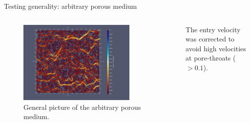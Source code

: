 \documentclass{beamer}
\begin{document}
	\begin{frame}{Testing generality: arbitrary porous medium}
		\begin{columns}
			\begin{figure}
				\centering
				\includegraphics[width=0.8\textwidth]{pics/pmVelLowV.png}
				\caption{General picture of the arbitrary porous medium.}   
			\end{figure}
			The entry velocity was corrected to avoid high velocities at pore-throats ($>0.1$).
		\end{columns}
	\end{frame}
	
\end{document}
